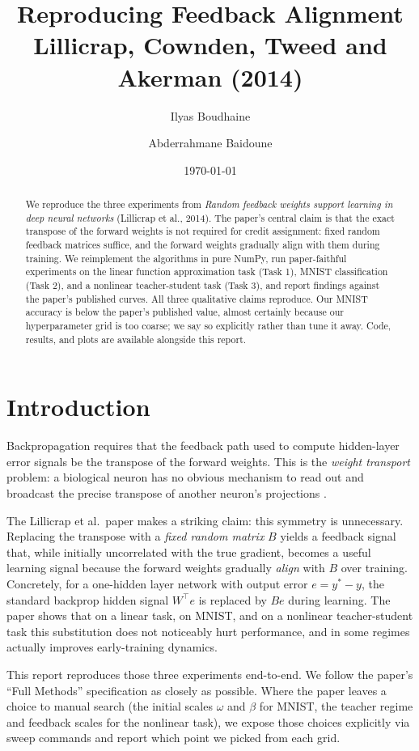 \documentclass[11pt,a4paper]{article}
\title{Reproducing Feedback Alignment \\
       \large Lillicrap, Cownden, Tweed and Akerman (2014)}
\author{Ilyas Boudhaine \and Abderrahmane Baidoune}
\date{\today}
\begin{document}
\maketitle

\begin{abstract}
We reproduce the three experiments from \emph{Random feedback weights support
learning in deep neural networks} (Lillicrap et al., 2014). The paper's
central claim is that the exact transpose of the forward weights is not
required for credit assignment: fixed random feedback matrices suffice, and
the forward weights gradually align with them during training. We reimplement
the algorithms in pure NumPy, run paper-faithful experiments on the linear
function approximation task (Task 1), MNIST classification (Task 2), and a
nonlinear teacher-student task (Task 3), and report findings against the
paper's published curves. All three qualitative claims reproduce. Our MNIST
accuracy is below the paper's published value, almost certainly because our
hyperparameter grid is too coarse; we say so explicitly rather than tune it
away. Code, results, and plots are available alongside this report.
\end{abstract}

\section{Introduction}

Backpropagation requires that the feedback path used to compute hidden-layer
error signals be the transpose of the forward weights. This is the
\emph{weight transport} problem: a biological neuron has no obvious mechanism
to read out and broadcast the precise transpose of another neuron's
projections \cite{lillicrap2014}.

The Lillicrap et al.\ paper makes a striking claim: this symmetry is
unnecessary. Replacing the transpose with a \emph{fixed random matrix} $B$
yields a feedback signal that, while initially uncorrelated with the true
gradient, becomes a useful learning signal because the forward weights
gradually \emph{align} with $B$ over training. Concretely, for a one-hidden
layer network with output error $e = y^* - y$, the standard backprop hidden
signal $W^\top e$ is replaced by $B e$ during learning. The paper shows that
on a linear task, on MNIST, and on a nonlinear teacher-student task this
substitution does not noticeably hurt performance, and in some regimes
actually improves early-training dynamics.

This report reproduces those three experiments end-to-end. We follow the
paper's ``Full Methods'' specification as closely as possible. Where the
paper leaves a choice to manual search (the initial scales $\omega$ and
$\beta$ for MNIST, the teacher regime and feedback scales for the nonlinear
task), we expose those choices explicitly via sweep commands and report
which point we picked from each grid.
\end{document}
